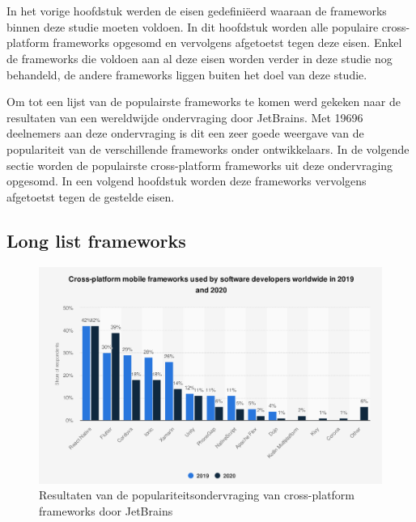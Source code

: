 \chapter{}
\label{ch:selecteren-frameworks}

In het vorige hoofdstuk werden de eisen gedefiniëerd waaraan de frameworks binnen deze studie moeten voldoen. In dit hoofdstuk worden alle populaire cross-platform frameworks opgesomd en vervolgens afgetoetst tegen deze eisen. Enkel de frameworks die voldoen aan al deze eisen worden verder in deze studie nog behandeld, de andere frameworks liggen buiten het doel van deze studie. 

Om tot een lijst van de populairste frameworks te komen werd gekeken naar de resultaten van een wereldwijde ondervraging door JetBrains. Met 19696 deelnemers aan deze ondervraging is dit een zeer goede weergave van de populariteit van de verschillende frameworks onder ontwikkelaars. In de volgende sectie worden de populairste cross-platform frameworks uit deze ondervraging opgesomd. In een volgend hoofdstuk worden deze frameworks vervolgens afgetoetst tegen de gestelde eisen.

\section{Long list frameworks}

\begin{figure}
    \includegraphics{PopularFrameworksGraph.png}
    \caption{Resultaten van de populariteitsondervraging van cross-platform frameworks door JetBrains}
    \label{fig:resultsSurvey}
\end{figure}